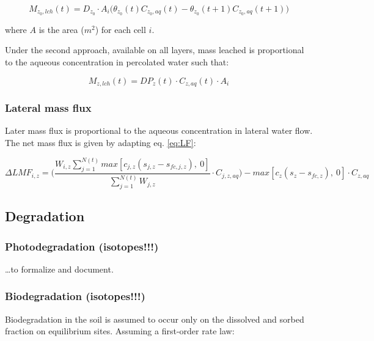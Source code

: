 \documentclass[]{article}
\begin{document}
\begin{equation}
M_{z_0,lch}(t) =  D_{z_0} \cdot A_i  \Big(\theta_{z_0}(t)C_{z_0,aq}(t)- \theta_{z_0}(t+1) C_{z_0,aq}(t+1) \Big) 
\label{eq:leached_mcgrath}
\end{equation}

where \(A\) is the area (\(m^2\)) for each cell \(i\).

Under the second approach, available on all layers, mass leached is
proportional to the aqueous concentration in percolated water such that:

\begin{equation}
M_{z,lch}(t) = DP_z(t) \cdot C_{z,aq }(t) \cdot A_i
\label{eq:leached_prop}
\end{equation}

\subsubsection{Lateral mass flux}\label{lateral-mass-flux}

Later mass flux is proportional to the aqueous concentration in lateral
water flow. The net mass flux is given by adapting eq. \ref{eq:LF}:

\begin{equation}
\Delta LMF_{i,z} = \Big( \frac{W_{i,z} \sum^{N(t)}_{j=1}max[c_{j,z}(s_{j,z}-s_{fc,j,z}),~0]}{ \sum^{N(t)}_{j=1} W_{j,z} } \cdot C_{j,z,aq} \Big) - max[ c_z(s_z-s_{fc,z}),~0]  \cdot C_{z,aq}
\label{eq:LMF}  
\end{equation}

\subsection{Degradation}\label{degradation}

\subsubsection{Photodegradation
(isotopes!!!)}\label{photodegradation-isotopes}

\ldots{}to formalize and document.

\subsubsection{Biodegradation
(isotopes!!!)}\label{biodegradation-isotopes}

Biodegradation in the soil is assumed to occur only on the dissolved and
sorbed fraction on equilibrium sites. Assuming a first-order rate law:
\end{document}
